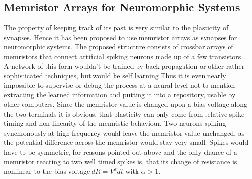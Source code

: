 \documentclass{SeminarV2}
\begin{document}
\subsection{Memristor Arrays for Neuromorphic Systems}
The property of keeping track of its past is very similar to the plasticity of synapses. Hence it has been proposed to use memristor arrays as synapses for neuromorphic systems. The proposed structure consists of crossbar arrays of memristors that connect artificial spiking neurons made up of a few transistors \cite{linares-barranco_memristance_2009}. A network of this form wouldn't be trained by back propagation or other rather sophisticated techniques, but would be self learning Thus it is  even nearly impossible to supervise or debug the process at a neural level not to mention  extracting the learned information and putting it into a repository, usable by other computers.
Since the memristor value is changed upon a bias voltage along the two terminals it is obvious, that plasticity can only come from relative spike timing and non-linearity of the memristic behaviour. Two neurons spiking synchronously at high frequency would leave the memristor value unchanged, as the potential difference across the memristor would stay very small. Spikes would have to be symmetric, for reasons pointed out above and the only chance of a memristor reacting to two well timed spikes is, that its change of resistance is nonlinear to the bias voltage \cite{zdenek_biolek_spice_????}\cite{nima_taherinejad_memristors_????} $dR = V^\alpha dt$ with $\alpha > 1$.
\end{document}
